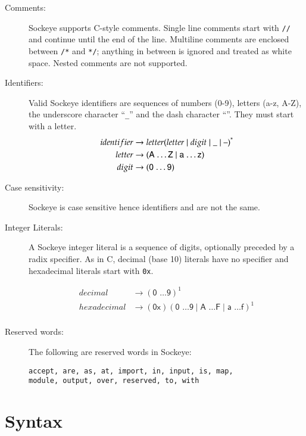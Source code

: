 \documentclass[a4paper,11pt,twoside]{report}
\begin{document}
{{{\begin{description}
\item[Comments:] Sockeye supports C-style comments.  Single line comments
  start with \texttt{//} and continue until the end of the line.
  Multiline comments are enclosed between \texttt{/*} and \texttt{*/};
  anything in between is ignored and treated as white space.
  Nested comments are not supported.

\item[Identifiers:] Valid Sockeye identifiers are sequences of numbers
  (0-9), letters (a-z, A-Z), the underscore character ``\texttt{\_}'' and the dash character ``\textendash''. They
  must start with a letter.
  \begin{align*}
  identifier & \rightarrow letter (letter \mid digit \mid \text{\_} \mid \text{\textendash})^{\textrm{*}} \\
  letter & \rightarrow (\textsf{A \ldots Z} \mid  \textsf{a \ldots z})\\
  digit & \rightarrow (\textsf{0 \ldots 9})
    \end{align*}

\item[Case sensitivity:] Sockeye is case sensitive hence identifiers  and  are not the same.
  
\item[Integer Literals:] A Sockeye integer literal is a sequence of
  digits, optionally preceded by a radix specifier.  As in C, decimal (base 10)
  literals have no specifier and hexadecimal literals start with
  \texttt{0x}.

\begin{align*}
decimal & \rightarrow (\textsf{0 \ldots 9})^{\textrm{1}}\\
hexadecimal & \rightarrow (\textsf{0x})(\textsf{0 \ldots 9} \mid \textsf{A \ldots F} \mid \textsf{a \ldots f})^{\textrm{1}}\\
\end{align*}

\item[Reserved words:] The following are reserved words in Sockeye:
\begin{verbatim}
accept, are, as, at, import, in, input, is, map,
module, output, over, reserved, to, with
\end{verbatim}

\end{description}


\chapter{Syntax}
\label{chap:declaration}

}}}
\end{document}
